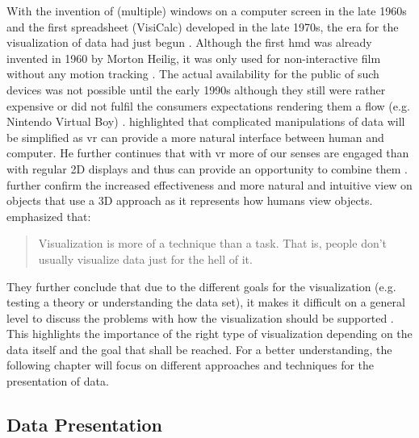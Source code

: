 With the invention of (multiple) windows on a computer screen in the late 1960s and the first spreadsheet (VisiCalc) developed in the late 1970s, the era for the visualization of data had just begun \citep{Myers1998}. Although the first \gls{hmd} was already invented in 1960 by Morton Heilig, it was only used for non-interactive film without any motion tracking \citep{vrs2015}. The actual availability for the public of such devices was not possible until the early 1990s although they still were rather expensive or did not fulfil the consumers expectations rendering them a flow (e.g. Nintendo Virtual Boy) \citep{vrs2015}. \cite{Ribarsky1994} highlighted that complicated manipulations of data will be simplified as \gls{vr} can provide a more natural interface between human and computer. He further continues that with \gls{vr} more of our senses are engaged than with regular 2D displays and thus can provide an opportunity to combine them \citep{Ribarsky1994}. \cite{Jamieson2007} further confirm the increased effectiveness and more natural and intuitive view on objects that use a 3D approach as it represents how humans view objects. \newline
\citet[p.411]{Stone1994} emphasized that: \blockquote{Visualization is more of a technique than a task. That is, people don't usually visualize data just for the hell of it.} They further conclude that due to the different goals for the visualization (e.g. testing a theory or understanding the data set), it makes it difficult on a general level to discuss the problems with how the visualization should be supported \citep{Stone1994}. This highlights the importance of the right type of visualization depending on the data itself and the goal that shall be reached. For a better understanding, the following chapter will focus on different approaches and techniques for the presentation of data.



\subsection{Data Presentation}

